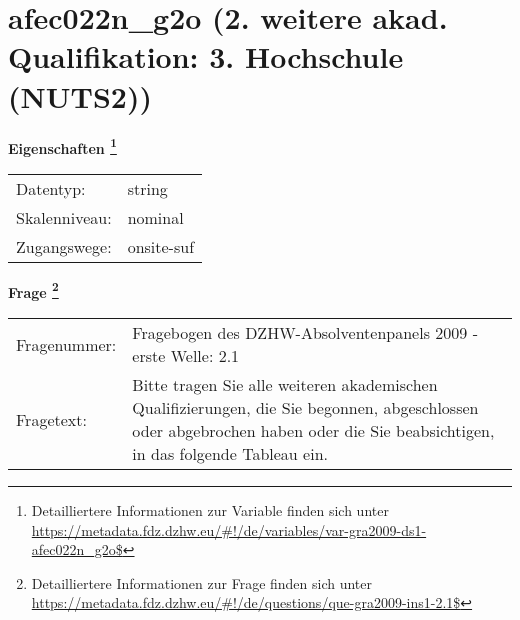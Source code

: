 
    \setcounter{footnote}{0}

    \vspace*{-1.8cm}
	\section{afec022n\_g2o (2. weitere akad. Qualifikation: 3. Hochschule (NUTS2))}
	\label{section:afec022n_g2o}



    \vspace*{0.5cm}
    \noindent\textbf{Eigenschaften
	\footnote{Detailliertere Informationen zur Variable finden sich unter
		\url{https://metadata.fdz.dzhw.eu/\#!/de/variables/var-gra2009-ds1-afec022n_g2o$}}}\\
	\begin{tabularx}{\hsize}{@{}lX}
	Datentyp: & string \\
	Skalenniveau: & nominal \\
	Zugangswege: &
	  onsite-suf
 \\
    \end{tabularx}



				\vspace*{0.5cm}
                \noindent\textbf{Frage
	                \footnote{Detailliertere Informationen zur Frage finden sich unter
		              \url{https://metadata.fdz.dzhw.eu/\#!/de/questions/que-gra2009-ins1-2.1$}}}\\
				\begin{tabularx}{\hsize}{@{}lX}
					Fragenummer: &
					  Fragebogen des DZHW-Absolventenpanels 2009 - erste Welle:
					  2.1
 \\
					Fragetext: & Bitte tragen Sie alle weiteren akademischen Qualifizierungen, die Sie begonnen, abgeschlossen oder abgebrochen haben oder die Sie beabsichtigen, in das folgende Tableau ein. \\
				\end{tabularx}






